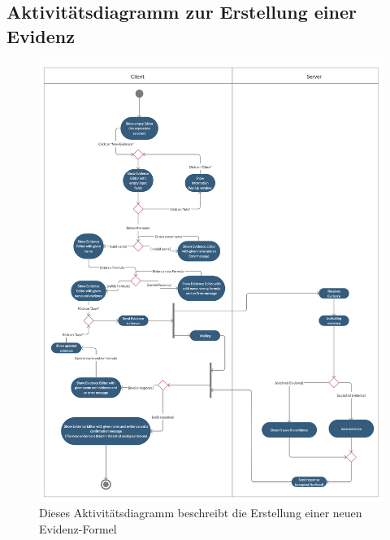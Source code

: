 \documentclass{article}
\begin{document}
\newpage
\subsection{Aktivitätsdiagramm zur Erstellung einer Evidenz}

\begin{figure}[ht!]
    \includegraphics[width=\textwidth,height=\textheight,keepaspectratio]{image/Activity_EvidenceFormular.png}
    \caption{Dieses Aktivitätsdiagramm beschreibt die Erstellung einer neuen Evidenz-Formel}
\end{figure}

\newpage
\end{document}
